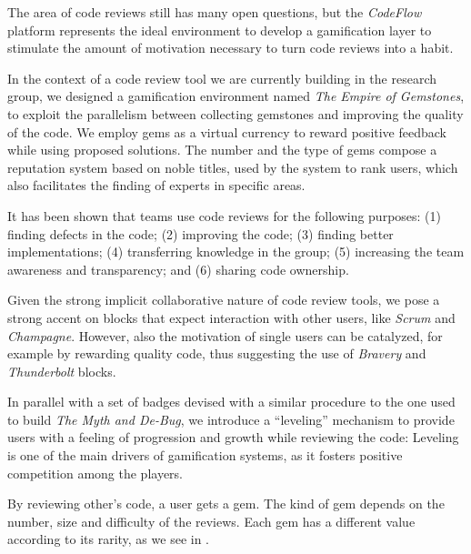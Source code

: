 The area of code reviews still has many open questions, but the \textit{CodeFlow} platform represents the ideal environment to develop a gamification layer to stimulate the amount of motivation necessary to turn code reviews into a habit.

In the context of a code review tool we are currently building in the research group, we designed a gamification environment named \textit{The Empire of Gemstones}, to exploit the parallelism between collecting gemstones and improving the quality of the code. We employ gems as a virtual currency to reward positive feedback while using proposed solutions. The number and the type of gems compose a reputation system based on noble titles, used by the system to rank users, which also facilitates the finding of experts in specific areas.

It has been shown \cite{Bacc2013a} that teams use code reviews for the following purposes: (1) finding defects in the code; (2) improving the code; (3) finding better implementations; (4) transferring knowledge in the group; (5) increasing the team awareness and transparency; and (6) sharing code ownership.

Given the strong implicit collaborative nature of code review tools, we pose a strong accent on blocks that expect interaction with other users, like \emph{Scrum} and \emph{Champagne}. However, also the motivation of single users can be catalyzed, for example by rewarding quality code, thus suggesting the use of \emph{Bravery} and \emph{Thunderbolt} blocks.

In parallel with a set of badges devised with a similar procedure to the one used to build \textit{The Myth and De-Bug}, we introduce a ``leveling'' mechanism to provide users with a feeling of progression and growth while reviewing the code: Leveling is one of the main drivers of gamification systems, as it fosters positive competition among the players.

By reviewing other's code, a user gets a gem. The kind of gem depends on the number, size and difficulty of the reviews. Each gem has a different value according to its rarity, as we see in . 

